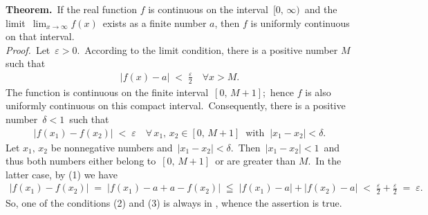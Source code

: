 \documentclass[12pt]{article}
\theoremstyle{definition}
\begin{document}
\textbf{Theorem.}\, If the real function $f$ is continuous on the interval \,$[0,\,\infty)$\, and the limit 
\,$\displaystyle\lim_{x\to\infty}f(x)$\, exists as a finite number $a$, then $f$ is uniformly continuous on that interval.\\

\emph{Proof.}\, Let\, $\varepsilon > 0$.\, According to the limit condition, there is a positive number $M$ such that 
\begin{align}
|f(x)\!-\!a| \;<\; \frac{\varepsilon}{2} \quad \forall x > M.
\end{align}
The function is continuous on the finite interval\, $[0,\,M\!+\!1]$;\, hence $f$ is also uniformly continuous on this compact interval.\, Consequently, there is a positive number\, $\delta < 1$\, such that
\begin{align}
|f(x_1)\!-\!f(x_2)| \;<\; \varepsilon 
\quad \forall\, x_1,\,x_2 \in [0,\,M\!+\!1]\;\;\mbox{with}\;\;|x_1\!-\!x_2| < \delta.
\end{align}
Let $x_1,\,x_2$ be nonnegative numbers and\, $|x_1\!-\!x_2| < \delta$.\, Then\, $|x_1\!-\!x_2| < 1$\, and thus both numbers either belong to\, $[0,\,M\!+\!1]$\, or are greater than $M$.\, In the latter case, by (1) we have
\begin{align}
|f(x_1)\!-\!f(x_2)| \;=\; |f(x_1)\!-\!a\!+\!a\!-\!f(x_2)|\;\leqq\; |f(x_1)\!-\!a|+|f(x_2)\!-\!a| 
\;<\; \frac{\varepsilon}{2}+\frac{\varepsilon}{2} \;=\; \varepsilon.
\end{align}
So, one of the conditions (2) and (3) is always in , whence the assertion is true.

\end{document}
